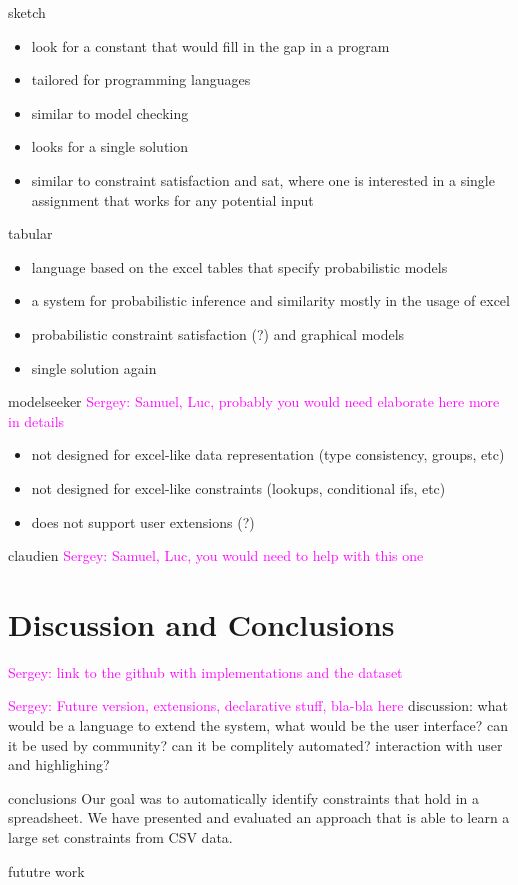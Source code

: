 \documentclass{ecai}
\newcommand{\sergey}[1]{\textcolor{magenta}{{\sc Sergey:} #1}\xspace}
\begin{document}
sketch \cite{sketch}
\begin{itemize}
  \item look for a constant that would fill in the gap in a program
  \item tailored for programming languages
  \item similar to model checking
  \item looks for a single solution
  \item similar to constraint satisfaction and sat, where one is interested in a single assignment that works for any potential input
\end{itemize}

tabular \cite{tabular}
\begin{itemize}
  \item language based on the excel tables that specify probabilistic models
  \item a system for probabilistic inference and similarity mostly in the usage of excel
  \item probabilistic constraint satisfaction (?) and graphical models
  \item single solution again
\end{itemize}

modelseeker \cite{modelseeker} \sergey{Samuel, Luc, probably you would need elaborate here more in details}

\begin{itemize}
  \item not designed for excel-like data representation (type consistency, groups, etc)
  \item not designed for excel-like constraints (lookups, conditional ifs, etc)
  \item does not support user extensions (?)
\end{itemize}

claudien \cite{claudien} \sergey{Samuel, Luc, you would need to help with this one}

\section{Discussion and Conclusions}
\sergey{link to the github with implementations and the dataset}


\sergey{Future version, extensions, declarative stuff, bla-bla here}
discussion: what would be a language to extend the system, what would be the user interface? can it be used by community?  can it be complitely automated? interaction with user and highlighing?


conclusions 
Our goal was to automatically identify constraints that hold in a spreadsheet.
We have presented and evaluated an approach that is able to learn a large set constraints from CSV data.

fututre work




\end{document}
